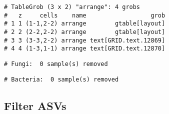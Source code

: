 \documentclass[
]{article}
\newenvironment{Shaded}{\begin{snugshade}}{\end{snugshade}}
\newcommand{\CommentTok}[1]{\textcolor[rgb]{0.56,0.35,0.01}{\textit{#1}}}
\newcommand{\FunctionTok}[1]{\textcolor[rgb]{0.00,0.00,0.00}{#1}}
\newcommand{\NormalTok}[1]{#1}
\newcommand{\OtherTok}[1]{\textcolor[rgb]{0.56,0.35,0.01}{#1}}
\newcommand{\SpecialCharTok}[1]{\textcolor[rgb]{0.00,0.00,0.00}{#1}}
\newcommand{\StringTok}[1]{\textcolor[rgb]{0.31,0.60,0.02}{#1}}
\begin{document}
\begin{verbatim}
# TableGrob (3 x 2) "arrange": 4 grobs
#   z     cells    name                  grob
# 1 1 (1-1,2-2) arrange        gtable[layout]
# 2 2 (2-2,2-2) arrange        gtable[layout]
# 3 3 (3-3,2-2) arrange text[GRID.text.12869]
# 4 4 (1-3,1-1) arrange text[GRID.text.12870]
\end{verbatim}

\begin{Shaded}
\end{Shaded}

\begin{verbatim}
# Fungi:  0 sample(s) removed
\end{verbatim}

\begin{Shaded}
\end{Shaded}

\begin{verbatim}
# Bacteria:  0 sample(s) removed
\end{verbatim}

\hypertarget{filter-asvs}{%
\subsection{Filter ASVs}\label{filter-asvs}}
\end{document}
